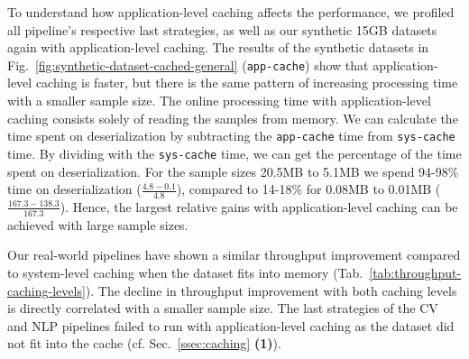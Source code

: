 {\color{diff2}

To understand how application-level caching affects the performance, we profiled all pipeline's respective last strategies, as well as our synthetic 15\:GB datasets again with application-level caching.
The results of the synthetic datasets in Fig.~\ref{fig:synthetic-dataset-cached-general} (\texttt{app-cache}) show that application-level caching is faster, but there is the same pattern of increasing processing time with a smaller sample size.
The online processing time with application-level caching consists solely of reading the samples from memory.
We can calculate the time spent on deserialization by subtracting the \texttt{app-cache} time from \texttt{sys-cache} time.
By dividing with the \texttt{sys-cache} time, we can get the percentage of the time spent on deserialization.
For the sample sizes 20.5\:MB to 5.1\:MB we spend 94-98\% time on deserialization ($\frac{4.8-0.1}{4.8}$), compared to 14-18\% for 0.08\:MB to 0.01\:MB ($\frac{167.3-138.3}{167.3}$).
Hence, the largest relative gains with application-level caching can be achieved with large sample sizes.

Our real-world pipelines have shown a similar throughput improvement compared to system-level caching when the dataset fits into memory (Tab.~\ref{tab:throughput-caching-levels}).
The decline in throughput improvement with both caching levels is directly correlated with a smaller sample size.
The last strategies of the CV and NLP pipelines failed to run with application-level caching as the dataset did not fit into the cache (cf. Sec.~\ref{ssec:caching} \textbf{(1)}).

}
















